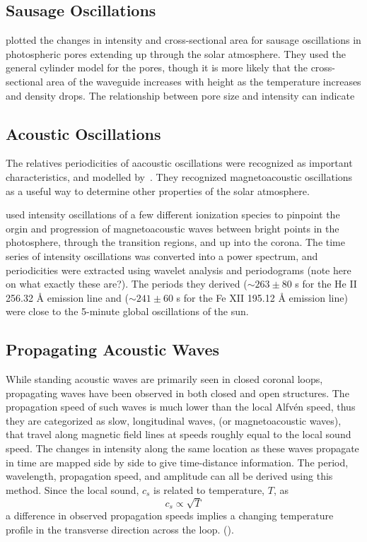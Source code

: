 \documentclass[preprint2]{aastex}
\begin{document}
\subsection{Sausage Oscillations}
\cite{sausage_1} plotted the changes in intensity and cross-sectional
area for sausage oscillations in photospheric pores extending up
through the solar atmosphere. They used the general cylinder model for
the pores, though it is more likely that the cross-sectional area of
the waveguide increases with height as the temperature increases and
density drops. The relationship between pore size and intensity can
indicate


\subsection{Acoustic Oscillations}

The relatives periodicities of aacoustic oscillations were recognized
as important characteristics, and modelled by~\cite{acoustic_1}.
They recognized magnetoacoustic oscillations as a useful way to determine
other properties of the solar atmosphere.

\cite{acoustic_2} used intensity oscillations of a few different ionization
species to pinpoint the orgin and progression of magnetoacoustic waves
between bright points in the photosphere, through the transition regions,
and up into the corona. The time series of intensity oscillations was
converted into a power spectrum, and periodicities were extracted using
wavelet analysis and periodograms (note here on what exactly these are?).
The periods they derived
($\sim 263 \pm 80$ s for the He II 256.32 \AA{} emission line and
($\sim 241 \pm 60$ s for the Fe XII 195.12 \AA{}  emission line)
were close to the 5-minute global oscillations of the sun.



\subsection{Propagating Acoustic Waves}

While standing acoustic waves are primarily seen in closed coronal
loops, propagating waves have been observed in both closed and open structures.
The propagation speed of such waves is much lower than the local Alfv\'en speed,
thus they are categorized as slow, longitudinal waves,
(or magnetoacoustic waves),
that travel along magnetic field lines at speeds roughly equal to
the local sound speed.
The changes in intensity along the same location as these waves
propagate in time are mapped side by side to give time-distance
information. The period, wavelength, propagation speed, and amplitude
can all be derived using this method.
Since the local sound, $c_{s}$ is related to temperature, $T$, as
\begin{equation}\label{sound-temp}
 c_{s} \propto \sqrt{T}
\end{equation}
a difference in observed propagation speeds implies a changing
temperature profile in the transverse direction across the loop.
(\cite{Nak}).
\end{document}
